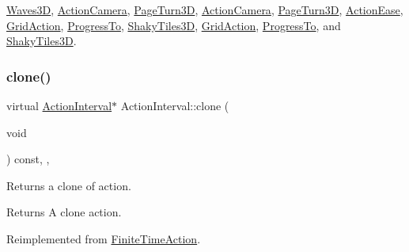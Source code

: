 \hyperlink{classWaves3D_ab41b6156741e145fbd6c3626bc16ec25}{Waves3D}, \hyperlink{classActionCamera_a77342a783d5575d2efc6a9c8823c810d}{Action\+Camera}, \hyperlink{classPageTurn3D_a4679e461471010cd87932c11be5bef9a}{Page\+Turn3D}, \hyperlink{classActionCamera_a316b7994753b978c45dbe150d6a711e5}{Action\+Camera}, \hyperlink{classPageTurn3D_a98aa1300a97553c4f4185d974021bdc4}{Page\+Turn3D}, \hyperlink{classActionEase_a39bec93fe161fb732a74d8e51a2fe08b}{Action\+Ease}, \hyperlink{classGridAction_a081a9340e9289cf2dcbb6bde121d4f24}{Grid\+Action}, \hyperlink{classProgressTo_a993bf559112f3bbe3f4d38027711fd8e}{Progress\+To}, \hyperlink{classShakyTiles3D_aefe37a5cda9d6898ad9c573e5a220ce1}{Shaky\+Tiles3D}, \hyperlink{classGridAction_a081a9340e9289cf2dcbb6bde121d4f24}{Grid\+Action}, \hyperlink{classProgressTo_a55a418dbd387fca470d425df87291b0b}{Progress\+To}, and \hyperlink{classShakyTiles3D_ad83d154be5494000eb8fcfe657e503ff}{Shaky\+Tiles3D}.

\mbox{\label{classActionInterval_abc93ce0c2f54a90eb216a7803f25f44a}} 
\subsubsection{\texorpdfstring{clone()}{clone()}\hspace{0.1cm}{\footnotesize\ttfamily [2/2]}}
{\footnotesize\ttfamily virtual \hyperlink{classActionInterval}{Action\+Interval}$\ast$ Action\+Interval\+::clone (\begin{DoxyParamCaption}\item[{void}]{ }\end{DoxyParamCaption}) const\hspace{0.3cm}{\ttfamily [inline]}, {\ttfamily [override]}, {\ttfamily [virtual]}}

Returns a clone of action.

\begin{DoxyReturn}{Returns}
A clone action. 
\end{DoxyReturn}


Reimplemented from \hyperlink{classFiniteTimeAction_a44813fca4fdf22f367a4657147dd150b}{Finite\+Time\+Action}.



